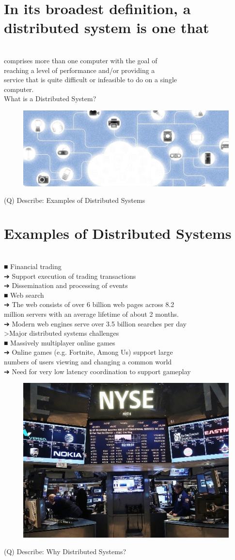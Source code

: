 \documentclass[12pt]{article}
\begin{document}
\section{In its broadest definition, a distributed system is one that }
\\
comprises more than one computer with the goal of \\
reaching a level of performance and/or providing a \\
service that is quite difficult or infeasible to do on a single \\
computer.\\
What is a Distributed System?\\
\begin{figure}[H]
\includegraphics[width=0.5\linewidth]{page8-image-1.png}
\end{figure}
\clearpage
(Q)
Describe: Examples of Distributed Systems
\clearpage
\section{Examples of Distributed Systems}
\\
■ Financial trading\\
➔ Support execution of trading transactions\\
➔ Dissemination and processing of events\\
■ Web search\\
➔ The web consists of over 6 billion web pages across 8.2 \\
million servers with an average lifetime of about 2 months.\\
➔ Modern web engines serve over 3.5 billion searches per day\\
 \textgreater  Major distributed systems challenges\\
■ Massively multiplayer online games\\
➔ Online games (e.g. Fortnite, Among Us) support large \\
numbers of users viewing and changing a common world\\
➔ Need for very low latency coordination to support gameplay\\
\begin{figure}[H]
\includegraphics[width=0.5\linewidth]{page9-image-1.png}
\end{figure}
\clearpage
(Q)
Describe: Why Distributed Systems?
\clearpage
\end{document}
